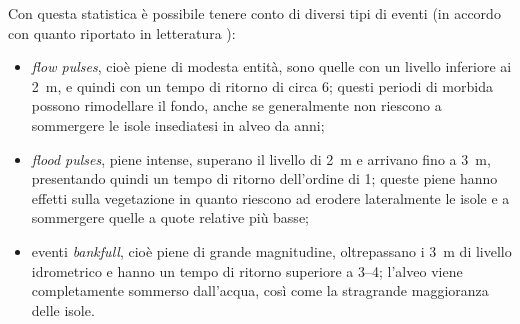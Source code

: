 Con questa statistica è possibile tenere conto di diversi tipi di eventi (in accordo con quanto riportato in letteratura ):
%
\begin{itemize}
	\item \emph{flow pulses}, cioè piene di modesta entità, sono quelle con un livello inferiore ai \SI{2}{\m}, e quindi con un tempo di ritorno di circa \SI{6}{\mesi}; questi periodi di morbida possono rimodellare il fondo, anche se generalmente non riescono a sommergere le isole insediatesi in alveo da anni;
	\item \emph{flood pulses}, piene intense, superano il livello di \SI{2}{\m} e arrivano fino a \SI{3}{\m}, presentando quindi un tempo di ritorno dell'ordine di \SI{1}{\anno}; queste piene hanno effetti sulla vegetazione in quanto riescono ad erodere lateralmente le isole e a sommergere quelle a quote relative più basse;
	\item eventi \emph{bankfull}, cioè piene di grande magnitudine, oltrepassano i \SI{3}{\m} di livello idrometrico e hanno un tempo di ritorno superiore a \SIrange[range-phrase={-}]{3}{4}{\anni}; l'alveo viene completamente sommerso dall'acqua, così come la stragrande maggioranza delle isole.
\end{itemize}
%

